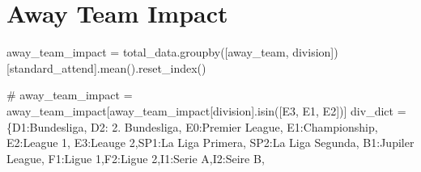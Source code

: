 \documentclass[
  letterpaper,
  DIV=11,
  numbers=noendperiod]{scrartcl}
\newenvironment{Shaded}{\begin{snugshade}}{\end{snugshade}}
\newcommand{\CommentTok}[1]{\textcolor[rgb]{0.37,0.37,0.37}{#1}}
\newcommand{\NormalTok}[1]{\textcolor[rgb]{0.00,0.23,0.31}{#1}}
\newcommand{\OperatorTok}[1]{\textcolor[rgb]{0.37,0.37,0.37}{#1}}
\newcommand{\StringTok}[1]{\textcolor[rgb]{0.13,0.47,0.30}{#1}}
\begin{document}
\hypertarget{away-team-impact}{%
\section{Away Team Impact}\label{away-team-impact}}

\begin{Shaded}
\begin{Highlighting}[]
\NormalTok{away\_team\_impact }\OperatorTok{=}\NormalTok{ total\_data.groupby([}\StringTok{\textquotesingle{}away\_team\textquotesingle{}}\NormalTok{, }\StringTok{\textquotesingle{}division\textquotesingle{}}\NormalTok{])[}\StringTok{\textquotesingle{}standard\_attend\textquotesingle{}}\NormalTok{].mean().reset\_index()}


\CommentTok{\# away\_team\_impact = away\_team\_impact[away\_team\_impact[\textquotesingle{}division\textquotesingle{}].isin([\textquotesingle{}E3\textquotesingle{}, \textquotesingle{}E1\textquotesingle{}, \textquotesingle{}E2\textquotesingle{}])]}
\NormalTok{div\_dict }\OperatorTok{=}\NormalTok{ \{}\StringTok{\textquotesingle{}D1\textquotesingle{}}\NormalTok{:}\StringTok{\textquotesingle{}Bundesliga\textquotesingle{}}\NormalTok{, }\StringTok{\textquotesingle{}D2\textquotesingle{}}\NormalTok{: }\StringTok{\textquotesingle{}2. Bundesliga\textquotesingle{}}\NormalTok{, }\StringTok{\textquotesingle{}E0\textquotesingle{}}\NormalTok{:}\StringTok{\textquotesingle{}Premier League\textquotesingle{}}\NormalTok{, }\StringTok{\textquotesingle{}E1\textquotesingle{}}\NormalTok{:}\StringTok{\textquotesingle{}Championship\textquotesingle{}}\NormalTok{, }
            \StringTok{\textquotesingle{}E2\textquotesingle{}}\NormalTok{:}\StringTok{\textquotesingle{}League 1\textquotesingle{}}\NormalTok{, }\StringTok{\textquotesingle{}E3\textquotesingle{}}\NormalTok{:}\StringTok{\textquotesingle{}Leauge 2\textquotesingle{}}\NormalTok{,}\StringTok{\textquotesingle{}SP1\textquotesingle{}}\NormalTok{:}\StringTok{\textquotesingle{}La Liga Primera\textquotesingle{}}\NormalTok{, }\StringTok{\textquotesingle{}SP2\textquotesingle{}}\NormalTok{:}\StringTok{\textquotesingle{}La Liga Segunda\textquotesingle{}}\NormalTok{,}
              \StringTok{\textquotesingle{}B1\textquotesingle{}}\NormalTok{:}\StringTok{\textquotesingle{}Jupiler League\textquotesingle{}}\NormalTok{, }\StringTok{\textquotesingle{}F1\textquotesingle{}}\NormalTok{:}\StringTok{\textquotesingle{}Ligue 1\textquotesingle{}}\NormalTok{,}\StringTok{\textquotesingle{}F2\textquotesingle{}}\NormalTok{:}\StringTok{\textquotesingle{}Ligue 2\textquotesingle{}}\NormalTok{,}\StringTok{\textquotesingle{}I1\textquotesingle{}}\NormalTok{:}\StringTok{\textquotesingle{}Serie A\textquotesingle{}}\NormalTok{,}\StringTok{\textquotesingle{}I2\textquotesingle{}}\NormalTok{:}\StringTok{\textquotesingle{}Seire B\textquotesingle{}}\NormalTok{, }

\end{Highlighting}
\end{Shaded}
\end{document}
